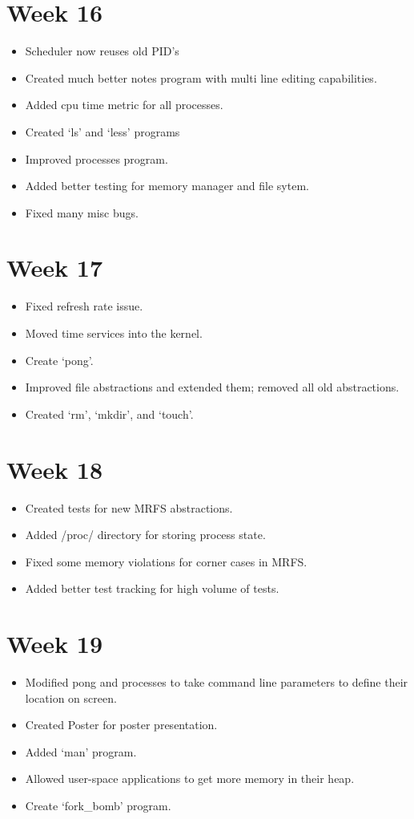 \documentclass[a4paper]{report}
\begin{document}
\section*{Week 16}
\begin{itemize}
\item Scheduler now reuses old PID's
\item Created much better notes program with multi line editing capabilities.
\item Added cpu time metric for all processes.
\item Created `ls' and `less' programs
\item Improved processes program.
\item Added better testing for memory manager and file sytem.
\item Fixed many misc bugs.
\end{itemize}

\section*{Week 17}
\begin{itemize}
\item Fixed refresh rate issue.
\item Moved time services into the kernel.
\item Create `pong'.
\item Improved file abstractions and extended them; removed all old abstractions.
\item Created `rm', `mkdir', and `touch'.
\end{itemize}

\section*{Week 18}
\begin{itemize}
\item Created tests for new MRFS abstractions.
\item Added /proc/ directory for storing process state.
\item Fixed some memory violations for corner cases in MRFS.
\item Added better test tracking for high volume of tests.
\end{itemize}

\section*{Week 19}
\begin{itemize}
\item Modified pong and processes to take command line parameters to define their location on screen.
\item Created Poster for poster presentation.
\item Added `man' program.
\item Allowed user-space applications to get more memory in their heap.
\item Create `fork\_bomb' program.
\end{itemize}
\end{document}
